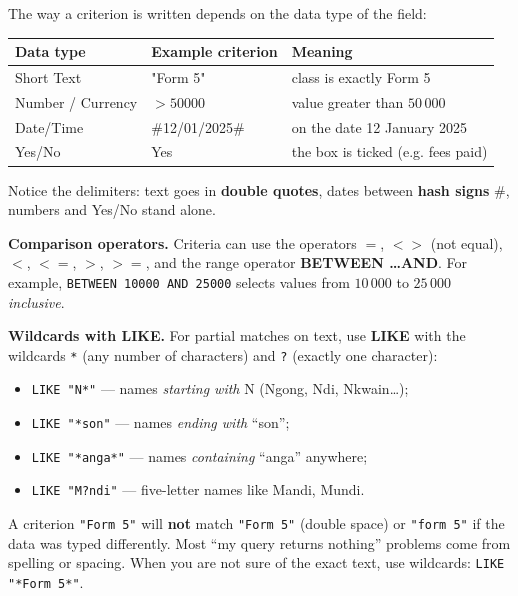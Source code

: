 \documentclass[11pt]{article}
\begin{document}
The way a criterion is written depends on the data type of the field:

\begin{center}
\begin{tabularx}{\linewidth}{|l|X|X|}
\hline
\rowcolor{popblueL} \textbf{Data type} & \textbf{Example criterion} & \textbf{Meaning} \\
\hline
Short Text & "Form 5" & class is exactly Form 5 \\
\hline
Number / Currency & $>50000$ & value greater than $50\,000$ \\
\hline
Date/Time & \#12/01/2025\# & on the date 12 January 2025 \\
\hline
Yes/No & Yes & the box is ticked (e.g. fees paid) \\
\hline
\end{tabularx}
\end{center}

Notice the delimiters: text goes in \textbf{double quotes}, dates between \textbf{hash signs} \#, numbers and Yes/No stand alone.

\textbf{Comparison operators.} Criteria can use the operators $=$, $<>$ (not equal), $<$, $<=$, $>$, $>=$, and the range operator \textbf{BETWEEN \ldots AND}. For example, \texttt{BETWEEN 10000 AND 25000} selects values from $10\,000$ to $25\,000$ \emph{inclusive}.

\textbf{Wildcards with LIKE.} For partial matches on text, use \textbf{LIKE} with the wildcards \texttt{*} (any number of characters) and \texttt{?} (exactly one character):

\begin{itemize}
\item \texttt{LIKE "N*"} --- names \emph{starting with} N (Ngong, Ndi, Nkwain\ldots);
\item \texttt{LIKE "*son"} --- names \emph{ending with} ``son'';
\item \texttt{LIKE "*anga*"} --- names \emph{containing} ``anga'' anywhere;
\item \texttt{LIKE "M?ndi"} --- five-letter names like Mandi, Mundi.
\end{itemize}

\begin{attention}
A criterion \texttt{"Form 5"} will \textbf{not} match \texttt{"Form  5"} (double space) or \texttt{"form 5"} if the data was typed differently. Most ``my query returns nothing'' problems come from spelling or spacing. When you are not sure of the exact text, use wildcards: \texttt{LIKE "*Form 5*"}.
\end{attention}
\end{document}
